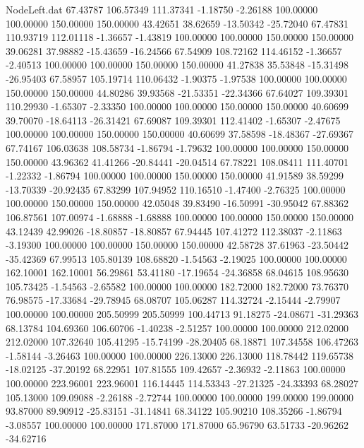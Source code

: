 \begin{filecontents}{NodeLeft.dat}
  67.43787  106.57349  111.37341    -1.18750   -2.26188  100.00000  100.00000  150.00000  150.00000   43.42651   38.62659  -13.50342  -25.72040
  67.47831  110.93719  112.01118    -1.36657   -1.43819  100.00000  100.00000  150.00000  150.00000   39.06281   37.98882  -15.43659  -16.24566
  67.54909  108.72162  114.46152    -1.36657   -2.40513  100.00000  100.00000  150.00000  150.00000   41.27838   35.53848  -15.31498  -26.95403
  67.58957  105.19714  110.06432    -1.90375   -1.97538  100.00000  100.00000  150.00000  150.00000   44.80286   39.93568  -21.53351  -22.34366
  67.64027  109.39301  110.29930    -1.65307   -2.33350  100.00000  100.00000  150.00000  150.00000   40.60699   39.70070  -18.64113  -26.31421
  67.69087  109.39301  112.41402    -1.65307   -2.47675  100.00000  100.00000  150.00000  150.00000   40.60699   37.58598  -18.48367  -27.69367
  67.74167  106.03638  108.58734    -1.86794   -1.79632  100.00000  100.00000  150.00000  150.00000   43.96362   41.41266  -20.84441  -20.04514
  67.78221  108.08411  111.40701    -1.22332   -1.86794  100.00000  100.00000  150.00000  150.00000   41.91589   38.59299  -13.70339  -20.92435
  67.83299  107.94952  110.16510    -1.47400   -2.76325  100.00000  100.00000  150.00000  150.00000   42.05048   39.83490  -16.50991  -30.95042
  67.88362  106.87561  107.00974    -1.68888   -1.68888  100.00000  100.00000  150.00000  150.00000   43.12439   42.99026  -18.80857  -18.80857
  67.94445  107.41272  112.38037    -2.11863   -3.19300  100.00000  100.00000  150.00000  150.00000   42.58728   37.61963  -23.50442  -35.42369
  67.99513  105.80139  108.68820    -1.54563   -2.19025  100.00000  100.00000  162.10001  162.10001   56.29861   53.41180  -17.19654  -24.36858
  68.04615  108.95630  105.73425    -1.54563   -2.65582  100.00000  100.00000  182.72000  182.72000   73.76370   76.98575  -17.33684  -29.78945
  68.08707  105.06287  114.32724    -2.15444   -2.79907  100.00000  100.00000  205.50999  205.50999  100.44713   91.18275  -24.08671  -31.29363
  68.13784  104.69360  106.60706    -1.40238   -2.51257  100.00000  100.00000  212.02000  212.02000  107.32640  105.41295  -15.74199  -28.20405
  68.18871  107.34558  106.47263    -1.58144   -3.26463  100.00000  100.00000  226.13000  226.13000  118.78442  119.65738  -18.02125  -37.20192
  68.22951  107.81555  109.42657    -2.36932   -2.11863  100.00000  100.00000  223.96001  223.96001  116.14445  114.53343  -27.21325  -24.33393
  68.28027  105.13000  109.09088    -2.26188   -2.72744  100.00000  100.00000  199.00000  199.00000   93.87000   89.90912  -25.83151  -31.14841
  68.34122  105.90210  108.35266    -1.86794   -3.08557  100.00000  100.00000  171.87000  171.87000   65.96790   63.51733  -20.96262  -34.62716

\end{filecontents}
